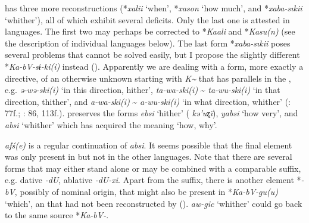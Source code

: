 \cite[114f.]{Benzing1956} has three more reconstructions (*\textit{xalii} ‘when’, *\textit{xason} ‘how much’, and *\textit{xaba-sıkii} ‘whither’), all of which exhibit several deficits. Only the last one is attested in  languages. The first two may perhaps be corrected to *\textit{Kaali} and *\textit{Kasu(n)} (see the description of individual languages below). The last form *\textit{xaba-sıkii} poses several problems that cannot be solved easily, but I propose the slightly different  *\textit{Ka-bV-sɨ-ki(i)} instead (). Apparently we are dealing with a  form, more exactly a directive, of an otherwise unknown  starting with \textit{K{\textasciitilde}} that has parallels in the , e.g.  \textit{ə-wə-ski(i)} ‘in this direction, hither’, \textit{ta-wa-ski(i)} {\textasciitilde} \textit{ta-wu-ski(i)} ‘in that direction, thither’, and \textit{a-wa-ski(i)} {\textasciitilde} \textit{a-wu-ski(i)} ‘in what direction, whither’ (\citealt{Benzing1955}: 77f.; \citealt{Benzing1955}: 86, 113f.).  preserves the forms \textit{ebsi} ‘hither’ ( \textit{kə’uʐï}), \textit{yabsi} ‘how very’, and \textit{absi} ‘whither’ which has acquired the meaning ‘how, why’.

 \textit{afś(e)} is a regular continuation of  \textit{absi}. It seems possible that the final element was only present in  but not in the other  languages. Note that there are several  forms that may either stand alone or may be combined with a comparable suffix, e.g.  dative \textit{-dU}, ablative \textit{-dU-xi}. Apart from the  suffix, there is another element *\textit{-bV}, possibly of nominal origin, that might also be present in  *\textit{Ka-bV-gu(u)} ‘which’, an  that had not been reconstructed by \citet{Benzing1956} ().  \textit{aw-gic} ‘whither’ could go back to the same source *\textit{Ka-bV-}.

